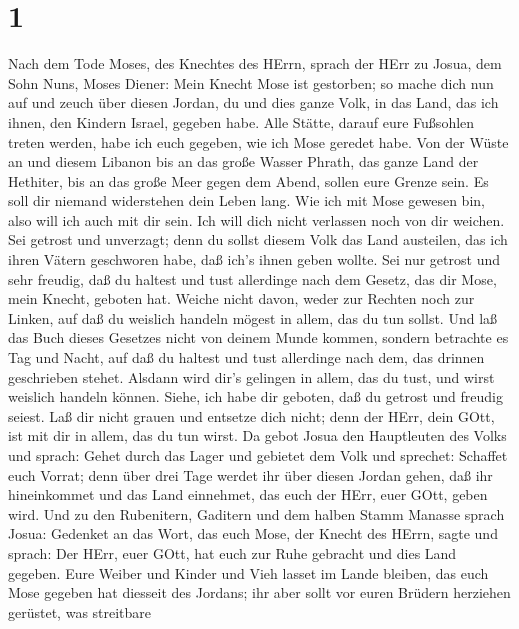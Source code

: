 \hypertarget{section}{%
\section{1}\label{section}}

 Nach dem Tode Moses, des Knechtes des HErrn, sprach der
HErr zu Josua, dem Sohn Nuns, Moses Diener:  Mein Knecht
Mose ist gestorben; so mache dich nun auf und zeuch über diesen Jordan,
du und dies ganze Volk, in das Land, das ich ihnen, den Kindern Israel,
gegeben habe.  Alle Stätte, darauf eure Fußsohlen treten
werden, habe ich euch gegeben, wie ich Mose geredet habe. 
Von der Wüste an und diesem Libanon bis an das große Wasser Phrath, das
ganze Land der Hethiter, bis an das große Meer gegen dem Abend, sollen
eure Grenze sein.  Es soll dir niemand widerstehen dein
Leben lang. Wie ich mit Mose gewesen bin, also will ich auch mit dir
sein. Ich will dich nicht verlassen noch von dir weichen. 
Sei getrost und unverzagt; denn du sollst diesem Volk das Land
austeilen, das ich ihren Vätern geschworen habe, daß ich's ihnen geben
wollte.  Sei nur getrost und sehr freudig, daß du haltest
und tust allerdinge nach dem Gesetz, das dir Mose, mein Knecht, geboten
hat. Weiche nicht davon, weder zur Rechten noch zur Linken, auf daß du
weislich handeln mögest in allem, das du tun sollst.  Und
laß das Buch dieses Gesetzes nicht von deinem Munde kommen, sondern
betrachte es Tag und Nacht, auf daß du haltest und tust allerdinge nach
dem, das drinnen geschrieben stehet. Alsdann wird dir's gelingen in
allem, das du tust, und wirst weislich handeln können. 
Siehe, ich habe dir geboten, daß du getrost und freudig seiest. Laß dir
nicht grauen und entsetze dich nicht; denn der HErr, dein GOtt, ist mit
dir in allem, das du tun wirst.  Da gebot Josua den
Hauptleuten des Volks und sprach:  Gehet durch das Lager
und gebietet dem Volk und sprechet: Schaffet euch Vorrat; denn über drei
Tage werdet ihr über diesen Jordan gehen, daß ihr hineinkommet und das
Land einnehmet, das euch der HErr, euer GOtt, geben wird. 
Und zu den Rubenitern, Gaditern und dem halben Stamm Manasse sprach
Josua:  Gedenket an das Wort, das euch Mose, der Knecht des
HErrn, sagte und sprach: Der HErr, euer GOtt, hat euch zur Ruhe gebracht
und dies Land gegeben.  Eure Weiber und Kinder und Vieh
lasset im Lande bleiben, das euch Mose gegeben hat diesseit des Jordans;
ihr aber sollt vor euren Brüdern herziehen gerüstet, was streitbare
